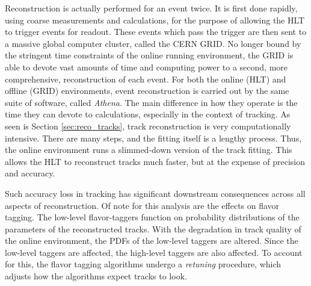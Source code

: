         Reconstruction is actually performed for an event twice.
        It is first done rapidly, using coarse measurements and calculations,
            for the purpose of allowing the HLT to trigger events for readout.
        These events which pass the trigger are then sent to a massive global computer cluster, called the CERN GRID.
        No longer bound by the stringent time constraints of the online running environment,
            the GRID is able to devote vast amounts of time and computing power to a second, 
            more comprehensive, reconstruction of each event.
        For both the online (HLT) and offline (GRID) environments, event reconstruction is carried out by the same suite of software,
            called \textit{Athena}\cite{athena_git}.
        The main difference in how they operate is the time they can devote to calculations, especially in the context of tracking.
        As seen is Section \ref{sec:reco_tracks}, track reconstruction is very computationally intensive.
        There are many steps, and the fitting itself is a lengthy process.
        Thus, the online environment runs a slimmed-down version of the track fitting.
        This allows the HLT to reconstruct tracks much faster, but at the expense of precision and accuracy.

        Such accuracy loss in tracking has significant downstream consequences across all aspects of reconstruction.
        Of note for this analysis are the effects on flavor tagging.
        The low-level flavor-taggers function on probability distributions of the parameters of the reconstructed tracks.
        With the degradation in track quality of the online environment, the PDFs of the low-level taggers are altered.
        Since the low-level taggers are affected, the high-level taggers are also affected.
        To account for this, the flavor tagging algorithms undergo a \textit{retuning} procedure, 
            which adjusts how the algorithms expect tracks to look.

